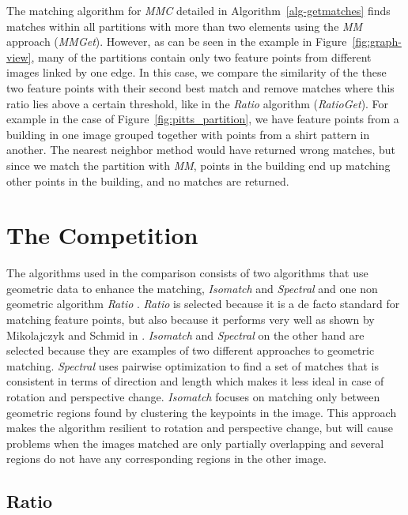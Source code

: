 The matching algorithm for \emph{MMC} detailed in 
Algorithm~\ref{alg-getmatches} finds matches within all partitions with 
more than two elements using the \emph{MM} approach (\emph{MMGet}).  
However, as can be seen in the example in Figure~\ref{fig:graph-view}, 
many of the partitions contain only two feature points from different 
images linked by one edge. In this case, we compare the similarity of 
the these two feature points with their second best match and remove 
matches where this ratio lies above a certain threshold, like in the 
\emph{Ratio} algorithm (\emph{RatioGet}).  For example in the case of 
Figure~\ref{fig:pitts_partition}, we have feature points from a building 
in one image grouped together with points from a shirt pattern in 
another.  The nearest neighbor method would have returned wrong matches, 
but since we match the partition with \emph{MM}, points in the building 
end up matching other points in the building, and no matches are 
returned.

\section{The Competition}

The algorithms used in the comparison consists of two algorithms that 
use geometric data to enhance the matching, \emph{Isomatch} 
\cite{das2008event} and \emph{Spectral} \cite{leordeanu2005spectral} and 
one non geometric algorithm \emph{Ratio} \cite{lowe2004sift}.  
\emph{Ratio} is selected because it is a de facto standard for matching 
feature points, but also because it performs very well as shown by 
Mikolajczyk and Schmid in \cite{mikolajczyk2005performance}.  
\emph{Isomatch} and \emph{Spectral} on the other hand are selected 
because they are examples of two different approaches to geometric 
matching. \emph{Spectral} uses pairwise optimization to find a set of 
matches that is consistent in terms of direction and length which makes 
it less ideal in case of rotation and perspective change. 
\emph{Isomatch} focuses on matching only between geometric regions found 
by clustering the keypoints in the image.  This approach makes the 
algorithm resilient to rotation and perspective change, but will cause 
problems when the images matched are only partially overlapping and 
several regions do not have any corresponding regions in the other 
image.

\subsection{Ratio}
\label{ss:ratio}

